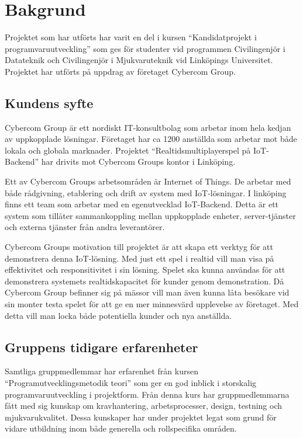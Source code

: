 \chapter{Bakgrund}
\label{cha:background}
Projektet som har utförts har varit en del i kursen ``Kandidatprojekt i programvaruutveckling'' som ges för studenter vid programmen Civilingenjör i Datateknik och Civilingenjör i Mjukvaruteknik vid Linköpings Universitet.\cite{tddd96} Projektet har utförts på uppdrag av företaget Cybercom Group.

\section{Kundens syfte}
\label{sec:customer-aim}
Cybercom Group är ett nordiskt IT-konsultbolag som arbetar inom hela kedjan av uppkopplade lösningar. Företaget har ca 1200 anställda som arbetar mot både lokala och globala marknader.\cite{cybercomgroup} Projektet ``Realtidsmultiplayerspel på IoT-Backend'' har drivits mot Cybercom Groups kontor i Linköping.

Ett av Cybercom Groups arbetsområden är Internet of Things. De arbetar med både rådgivning, etablering och drift av system med IoT-lösningar.\cite{cybercomiot} I linköping finns ett team som arbetar med en egenutvecklad IoT-Backend. Detta är ett system som tillåter sammankoppling mellan uppkopplade enheter, server-tjänster och externa tjänster från andra leverantörer.

Cybercom Groups motivation till projektet är att skapa ett verktyg för att demonstrera denna IoT-lösning. Med just ett spel i realtid vill man visa på effektivitet och responsitivitet i sin lösning. Spelet ska kunna användas för att demonstrera systemets realtidskapacitet för kunder genom demonstration. Då Cybercom Group befinner sig på mässor vill man även kunna låta besökare vid sin monter testa spelet för att ge en mer minnesvärd upplevelse av företaget. Med detta vill man locka både potentiella kunder och nya anställda.

\section{Gruppens tidigare erfarenheter}
\label{sec:earlier-experience}
Samtliga gruppmedlemmar har erfarenhet från kursen ``Programutvecklingsmetodik teori'' som ger en god inblick i storskalig programvaruutveckling i projektform. Från denna kurs har gruppmedlemmarna fått med sig kunskap om kravhantering, arbetsprocesser, design, testning och mjukvarukvalitet.\cite{tddc93} Dessa kunskaper har under projektet legat som grund för vidare utbildning inom både generella och rollspecifika områden.

